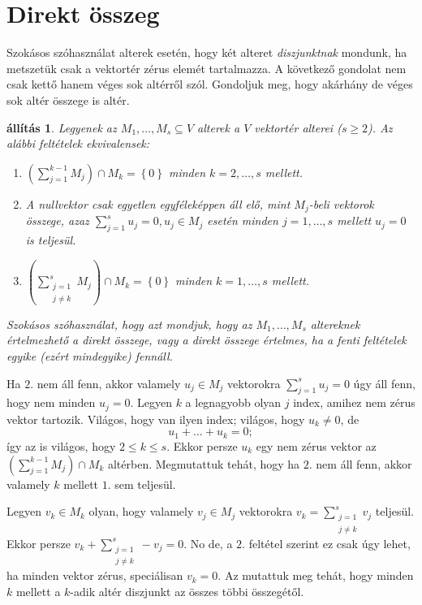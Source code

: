 \documentclass[9pt, a4paper, showtrims]{memoir}
\makeatletter
\renewenvironment{proof}[1][\proofname]
    {\par\pushQED{\qed}%
    \normalfont \topsep6\p@\@plus6\p@\relax
    \trivlist
    \item[\hskip\labelsep
        \itshape
    #1\@addpunct{:}]\ignorespaces}
    {\popQED\endtrivlist\@endpefalse}
\theoremstyle{plain}
\newtheorem{proposition}{állítás}[chapter]
\theoremstyle{remark}
\theoremstyle{definition}
\makeatother
\begin{document}
\section{Direkt összeg}
Szokásos szóhasználat alterek esetén, hogy két alteret \emph{diszjunktnak}
mondunk,
ha metszetük csak a vektortér zérus elemét tartalmazza.
A következő gondolat nem csak kettő hanem véges sok altérről szól.
Gondoljuk meg, hogy akárhány de véges sok altér összege is altér.
\begin{proposition}
    \label{pr:direktosszegsorrend}
    Legyenek az $M_1,\ldots,M_s\subseteq V$ alterek a $V$ vektortér alterei ($s\geq 2$).
    Az alábbi feltételek ekvivalensek:
    \begin{enumerate}
		\item 
            $\left( \sum_{j=1}^{k-1}M_j \right)\cap M_k
			=
			\left\{ 0 \right\}
            $
		    minden $k=2,\ldots,s$ mellett.
        \item
            A nullvektor csak egyetlen egyféleképpen áll elő, mint $M_j$-beli vektorok összege,
            azaz $\sum_{j=1}^su_j=0, u_j\in M_j$ esetén minden $j=1,\ldots,s$ mellett $u_j=0$ is teljesül.
        \item
            $\left( \sum_{\substack{j=1\\j\neq k}}^sM_j \right)\cap M_k
			=
			\left\{ 0 \right\}
            $
		    minden $k=1,\ldots,s$ mellett.
    \end{enumerate}
    Szokásos szóhasználat, hogy azt mondjuk, hogy az $M_1,\ldots,M_s$ altereknek \emph{értelmezhető a direkt összege},   vagy a \emph{direkt összege értelmes}, ha a fenti feltételek egyike (ezért mindegyike) fennáll.
\end{proposition}
\begin{proof}[Az $1.\Rightarrow 2.$ igazolása]
    Ha $2.$ nem áll fenn, akkor valamely $u_j\in M_j$ vektorokra $\sum_{j=1}^su_j=0$ úgy áll fenn,
    hogy nem minden $u_j=0$.
    Legyen $k$ a legnagyobb olyan $j$ index, amihez nem zérus vektor tartozik.
    Világos, hogy van ilyen index; 
    világos, hogy $u_k\neq 0$, de
    \[
        u_1+\dots+u_k=0;
    \]
    így az is világos, hogy $2\leq k\leq s$.
    Ekkor persze $u_k$ egy nem zérus vektor az $\left( \sum_{j=1}^{k-1}M_j \right)\cap M_k$ altérben.
    Megmutattuk tehát, hogy ha $2.$ nem áll fenn, akkor valamely $k$ mellett $1.$ sem teljesül.
\end{proof}
\begin{proof}[A $2.\Rightarrow 3.$ igazolása]
        Legyen $v_k\in M_k$ olyan, hogy valamely $v_j\in M_j$ vektorokra 
        $v_k=\sum_{\substack{j=1\\j\neq k}}^sv_j$
        teljesül. 
        Ekkor persze 
        $v_k+\sum_{\substack{j=1\\j\neq k}}^s-v_j=0$. 
        No de, a $2.$ feltétel szerint ez csak úgy lehet, ha minden vektor zérus, speciálisan $v_k=0$.
        Az mutattuk meg tehát, hogy minden $k$ mellett a $k$-adik altér diszjunkt az összes többi összegétől.
\end{proof}
\end{document}
